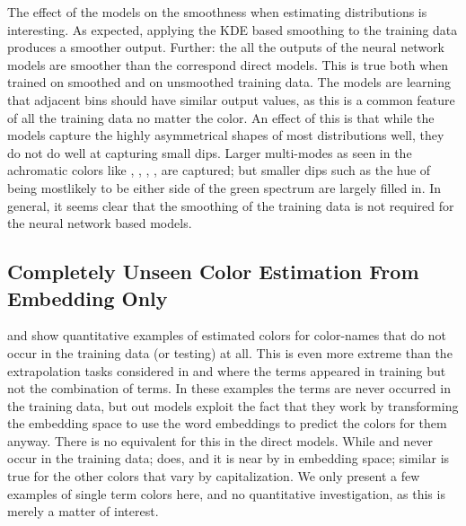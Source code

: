 \documentclass[11pt,a4paper]{article}
\begin{document}
The effect of the models on the smoothness when estimating distributions is interesting.
As expected, applying the KDE based smoothing to the training data produces a smoother output.
Further: the all the outputs of the neural network models are smoother than the correspond direct models.
This is true both when trained on smoothed and on unsmoothed training data.
The models are learning that adjacent bins should have similar output values, as this is a common feature of all the training data no matter the color.
An effect of this is that while the models capture the highly asymmetrical shapes of most distributions well,
they do not do well at capturing small dips.
Larger multi-modes as seen in the achromatic colors like , , , , are captured; but smaller dips such as the hue of  being mostlikely to be either side of the green spectrum are largely filled in.
In general, it seems clear that the smoothing of the training data is not required for the neural network based models.









\subsection{Completely Unseen Color Estimation From Embedding Only}\label{sec:embeddingonly}
 and  show quantitative examples of estimated colors for color-names that do not occur in the training data (or testing) at all.
This is even more extreme than the extrapolation tasks considered in  and  where the terms appeared in training but not the combination of terms.
In these examples the terms are never occurred in the training data, but out models exploit the fact that they work by transforming the embedding space to use the word embeddings to predict the colors for them anyway.
There is no equivalent for this in the direct models.
While  and  never occur in the training data;  does, and it is near by in embedding space; similar is true for the other colors that vary by capitalization.
We only present a few examples of single term colors here, and no quantitative investigation, as this is merely a matter of interest.
\end{document}
